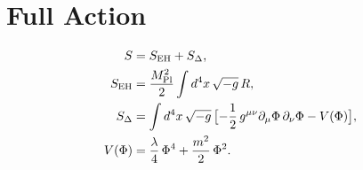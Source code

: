 \section{Full Action}
\begin{align}
S &= S_{\text{EH}} + S_{\Delta}, \\
S_{\text{EH}} &= \frac{M_{\rm Pl}^{2}}{2}\int d^{4}x\,\sqrt{-g}\,R,\\
S_{\Delta} &= \int d^{4}x\,\sqrt{-g}\,
  \bigl[ -\frac12\,g^{\mu\nu}\partial_\mu\Phi\,\partial_\nu\Phi
  - V(\Phi) \bigr],\\
V(\Phi) &= \frac{\lambda}{4}\,\Phi^{4} + \frac{m^{2}}{2}\,\Phi^{2}.
\end{align}


